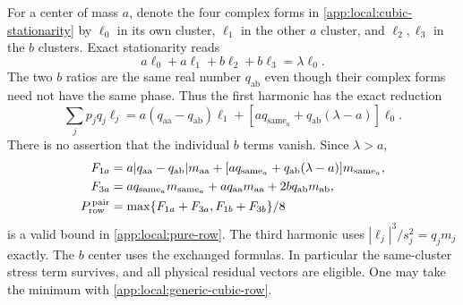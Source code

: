 For a center of mass $a$, denote the four complex forms in
\eqref{app:local:cubic-stationarity} by $\ell_0$ in its own cluster,
$\ell_1$ in the other $a$ cluster, and $\ell_2,\ell_3$ in the $b$
clusters. Exact stationarity reads
\[
 a\ell_0+a\ell_1+b\ell_2+b\ell_3=\lambda\ell_0.
\]
The two $b$ ratios are the same real number $q_{\mathrm{ab}}$ even
though their complex forms need not have the same phase. Thus the
first harmonic has the exact reduction
\begin{equation}\label{app:local:two-pair-harmonic}
 \sum_jp_jq_j\ell_j
 =a(q_{\mathrm{aa}}-q_{\mathrm{ab}})\ell_1+
 [a q_{\mathrm{same}_a}
                  +q_{\mathrm{ab}}(\lambda-a)]\ell_0.
\end{equation}
There is no assertion that the individual $b$ terms vanish.
Since $\lambda>a$,
\begin{align}
 F_{1a}&=a|q_{\mathrm{aa}}-q_{\mathrm{ab}}|m_{\mathrm{aa}}
    +[a q_{\mathrm{same}_a}+q_{\mathrm{ab}}(\lambda-a)]
                                          m_{\mathrm{same}_a},\nonumber\\
 F_{3a}&=a q_{\mathrm{same}_a}m_{\mathrm{same}_a}
         +a q_{\mathrm{aa}}m_{\mathrm{aa}}
         +2b q_{\mathrm{ab}}m_{\mathrm{ab}},\nonumber\\
 P_{\rm row}^{\,\rm pair}
   &=\max\{F_{1a}+F_{3a},F_{1b}+F_{3b}\}/8
 \label{app:local:two-pair-row}
\end{align}
is a valid bound in \eqref{app:local:pure-row}.
The third harmonic uses $|\ell_j|^3/s_j^2=q_jm_j$ exactly.
The $b$ center uses the exchanged formulas. In particular the
same-cluster stress term survives, and all physical residual vectors
are eligible. One may take the minimum with
\eqref{app:local:generic-cubic-row}.

